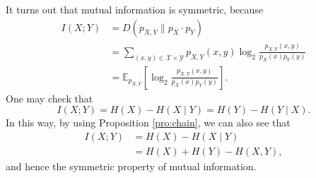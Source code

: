 \documentclass[math]{amznotes}
\theoremstyle{remark}
\begin{document}
It turns out that mutual information is symmetric, because 
\begin{align*}
    I\left(X ; Y\right) & = D\left(p_{X, Y} \parallel p_X \cdot p_Y\right) \\
    & = \sum_{(x, y) \in \mathcal{X} \times \mathcal{Y}}p_{X, Y}(x, y)\log_2\frac{p_{X, Y}(x, y)}{p_X(x)p_Y(y)} \\
    & = \mathbb{E}_{p_{X, Y}}\left[\log_2\frac{p_{X, Y}(x, y)}{p_X(x)p_Y(y)}\right].
\end{align*}
One may check that 
\begin{equation*}
    I\left(X ; Y\right) = H\left(X\right) - H\left(X \mid Y\right) = H\left(Y\right) - H\left(Y \mid X\right).
\end{equation*}
In this way, by using Proposition \ref{pro:chain}, we can also see that 
\begin{align*}
    I\left(X ; Y\right) & = H\left(X\right) - H\left(X \mid Y\right) \\
    & = H\left(X\right) + H\left(Y\right) - H\left(X, Y\right),
\end{align*}
and hence the symmetric property of mutual information.
\end{document}
